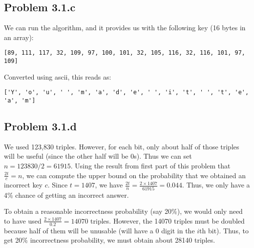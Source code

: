 \documentclass[psamsfonts]{amsart}
\begin{document}
\subsection{Problem 3.1.c}

We can run the algorithm, and it provides us with the following key (16 bytes in an array):
\begin{verbatim}
[89, 111, 117, 32, 109, 97, 100, 101, 32, 105, 116, 32, 116, 101, 97, 109]
\end{verbatim}

Converted using ascii, this reads as:
\begin{verbatim}
['Y', 'o', 'u', ' ', 'm', 'a', 'd', 'e', ' ', 'i', 't', ' ', 't', 'e', 'a', 'm']
\end{verbatim}

\subsection{Problem 3.1.d}

We used 123,830 triples. However, for each bit, only about half of those triples will be useful (since the other half will be 0s). Thus we can set $n = 123830/2 = 61915$. Using the result from first part of this problem that $\frac{2t}{c} = n$, we can compute the upper bound on the probability that we obtained an incorrect key $c$. Since $t = 1407$, we have $\frac{2t}{n} = \frac{2 \times 1407}{61915} = 0.044$. Thus, we only have a 4\% chance of getting an incorrect answer.

To obtain a reasonable incorrectness probability (say 20\%), we would only need to have used $\frac{2 \times 1407}{0.2} = 14070$ triples. However, the 14070 triples must be doubled because half of them will be unusable (will have a 0 digit in the $i$th bit). Thus, to get 20\% incorrectness probability, we must obtain about 28140 triples.
\end{document}
